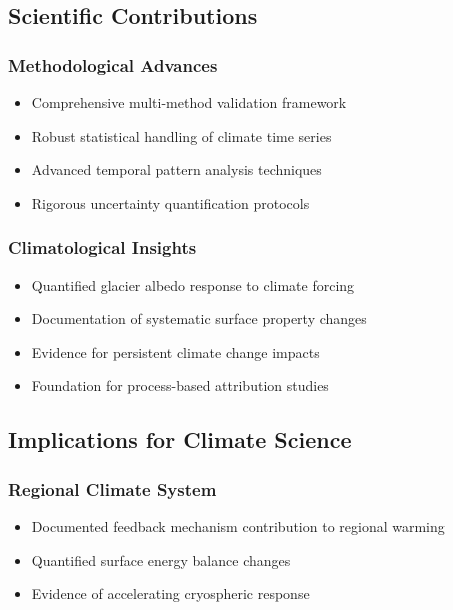 \documentclass[12pt,a4paper]{article}
\begin{document}
\subsection{Scientific Contributions}

\subsubsection{Methodological Advances}
\begin{itemize}
    \item Comprehensive multi-method validation framework
    \item Robust statistical handling of climate time series
    \item Advanced temporal pattern analysis techniques
    \item Rigorous uncertainty quantification protocols
\end{itemize}

\subsubsection{Climatological Insights}
\begin{itemize}
    \item Quantified glacier albedo response to climate forcing
    \item Documentation of systematic surface property changes
    \item Evidence for persistent climate change impacts
    \item Foundation for process-based attribution studies
\end{itemize}

\subsection{Implications for Climate Science}

\subsubsection{Regional Climate System}
\begin{itemize}
    \item Documented feedback mechanism contribution to regional warming
    \item Quantified surface energy balance changes
    \item Evidence of accelerating cryospheric response
\end{itemize}
\end{document}
